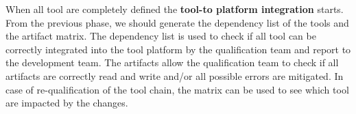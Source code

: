 

When all tool are completely defined the {\bf tool-to platform
  integration} starts. From the previous phase, we should generate the
dependency list of the tools and the artifact matrix.  The dependency
list is used to check if all tool can be correctly integrated into the
tool platform by the qualification team and report to the development
team.  The artifacts allow the qualification team to check if all
artifacts are correctly read and write and/or all possible errors are
mitigated.  In case of re-qualification of the tool chain, the matrix
can be used to see which tool are impacted by the changes.





